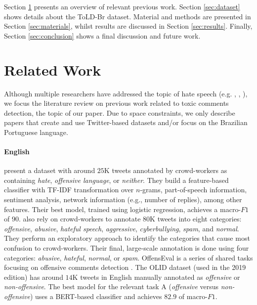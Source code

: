 \documentclass[11pt,a4paper]{article}
\begin{document}
Section \ref{sec:related} presents an overview of relevant previous work. Section \ref{sec:dataset} shows details about the ToLD-Br dataset. Material and methods are presented in Section \ref{sec:materials}, whilst results are discussed in Section \ref{sec:results}. Finally, Section \ref{sec:conclusion} shows a final discussion and future work. 


\section{Related Work} \label{sec:related}
Although multiple researchers have addressed the topic of hate speech (e.g. , , ), we focus the literature review on previous work related to toxic comments detection, the topic of our paper. 
Due to space constraints, we only describe papers that create and use Twitter-based datasets and/or focus on the Brazilian Portuguese language.

\paragraph{English}  present a dataset with around $25$K tweets annotated by crowd-workers as containing \textit{hate}, \textit{offensive language}, or \textit{neither}. They build a feature-based classifier with TF-IDF transformation over $n$-grams, part-of-speech information, sentiment analysis, network information (e.g., number of replies), among other features. Their best model, trained using logistic regression, achieves a macro-$F1$ of $90$. 
 also rely on crowd-workers to annotate $80$K tweets into eight categories: \textit{offensive}, \textit{abusive}, \textit{hateful speech}, \textit{aggressive}, \textit{cyberbullying}, \textit{spam}, and \textit{normal}. They perform an exploratory approach to identify the categories that cause most confusion to crowd-workers. Their final, large-scale annotation is done using four categories: \textit{abusive}, \textit{hateful}, \textit{normal}, or \textit{spam}. OffensEval is a series of shared tasks focusing on offensive comments detection \cite{zampieri-etal-2019-semeval,zampieri-etal-2020-semeval}. The OLID dataset (used in the 2019 edition) has around $14$K tweets in English manually annotated as \textit{offensive} or \textit{non-offensive}. The best model for the relevant task A (\textit{offensive} versus \textit{non-offensive}) uses a BERT-based classifier and achieves $82.9$ of macro-$F1$.
\end{document}
